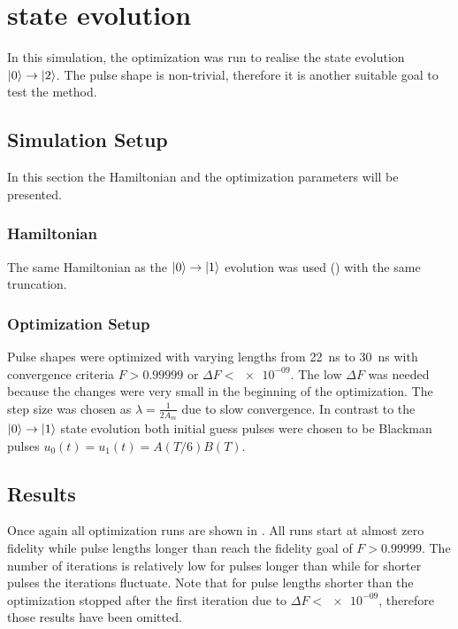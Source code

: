\documentclass[main.tex]{subfiles}
\begin{document}
\chapter{%
\texorpdfstring{}{0 -> 2} state evolution
}
In this simulation, the optimization was run to realise the state evolution \(\ket{0}\rightarrow\ket{2}\).
The pulse shape is non-trivial, therefore it is another suitable goal to test the method.

\section{Simulation Setup}
In this section the Hamiltonian and the optimization parameters will be presented.

\subsection{Hamiltonian}
The same Hamiltonian as the \(\ket{0}\rightarrow\ket{1}\) evolution was used () with the same truncation.

\subsection{Optimization Setup}
Pulse shapes were optimized with varying lengths from \SI{22}{\nano\second} to \SI{30}{\nano\second} with convergence criteria \(F>0.99999\) or \(\Delta F < \num{e-09}\).
The low \(\Delta F\) was needed because the changes were very small in the beginning of the optimization.
The step size was chosen as \(\lambda = \frac{1}{2A_{m}}\) due to slow convergence.
In contrast to the \(\ket{0}\rightarrow\ket{1}\) state evolution both initial guess pulses were chosen to be Blackman pulses \(u_0(t) = u_1(t) = A(T/6)B(T)\).

\section{Results}
Once again all optimization runs are shown in .
All runs start at almost zero fidelity while pulse lengths longer than  reach the fidelity goal of \(F > 0.99999\).
The number of iterations is relatively low for pulses longer than  while for shorter pulses the iterations fluctuate.
Note that for pulse lengths shorter than  the optimization stopped after the first iteration due to \(\Delta F < \num{e-09}\), therefore those results have been omitted.
\end{document}
